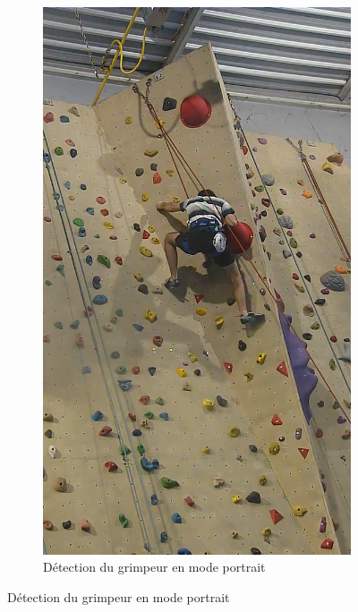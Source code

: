 \documentclass[a4paper, 11pt, french]{article}
\begin{document}
\begin{figure}[!ht]
\begin{center}
\begin{subfigure}[t]{0.22\textwidth}
            \includegraphics[width=\textwidth]{exemplePortrait.png}
            \caption{Détection du grimpeur en mode portrait}
            \label{fig:test2}
        \end{subfigure}


\end{center}
\end{figure}
\end{document}
